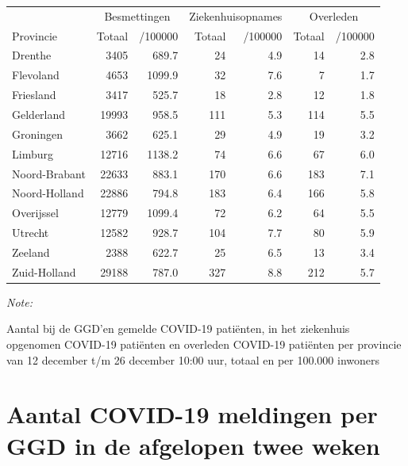 \documentclass[
  english,
  man,floatsintext]{apa6}
\begin{document}
\begin{table}[H]
\centering
\begin{threeparttable}
\begin{tabular}{lrrrrrr}
\toprule
\multicolumn{1}{c}{ } & \multicolumn{2}{c}{Besmettingen} & \multicolumn{2}{c}{Ziekenhuisopnames} & \multicolumn{2}{c}{Overleden} \\
\cmidrule(l{3pt}r{3pt}){2-3} \cmidrule(l{3pt}r{3pt}){4-5} \cmidrule(l{3pt}r{3pt}){6-7}
Provincie & Totaal & /100000 & Totaal & /100000 & Totaal & /100000\\
\midrule
Drenthe & 3405 & 689.7 & 24 & 4.9 & 14 & 2.8\\
Flevoland & 4653 & 1099.9 & 32 & 7.6 & 7 & 1.7\\
Friesland & 3417 & 525.7 & 18 & 2.8 & 12 & 1.8\\
Gelderland & 19993 & 958.5 & 111 & 5.3 & 114 & 5.5\\
Groningen & 3662 & 625.1 & 29 & 4.9 & 19 & 3.2\\
Limburg & 12716 & 1138.2 & 74 & 6.6 & 67 & 6.0\\
Noord-Brabant & 22633 & 883.1 & 170 & 6.6 & 183 & 7.1\\
Noord-Holland & 22886 & 794.8 & 183 & 6.4 & 166 & 5.8\\
Overijssel & 12779 & 1099.4 & 72 & 6.2 & 64 & 5.5\\
Utrecht & 12582 & 928.7 & 104 & 7.7 & 80 & 5.9\\
Zeeland & 2388 & 622.7 & 25 & 6.5 & 13 & 3.4\\
Zuid-Holland & 29188 & 787.0 & 327 & 8.8 & 212 & 5.7\\
\bottomrule
\end{tabular}
\begin{tablenotes}
\item \textit{Note: } 
\item Aantal bij de GGD’en gemelde COVID-19 patiënten, in het ziekenhuis opgenomen COVID-19 patiënten en overleden COVID-19 patiënten per provincie van 12 december t/m 26 december 10:00 uur, totaal en per 100.000 inwoners
\end{tablenotes}
\end{threeparttable}
\end{table}

\newpage

\hypertarget{aantal-covid-19-meldingen-per-ggd-in-de-afgelopen-twee-weken}{%
\section{Aantal COVID-19 meldingen per GGD in de afgelopen twee weken}\label{aantal-covid-19-meldingen-per-ggd-in-de-afgelopen-twee-weken}}
\end{document}
